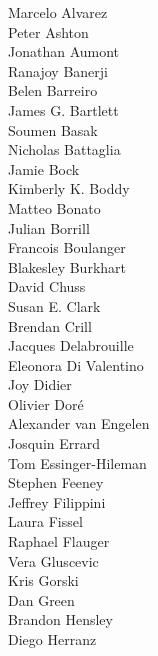 \documentclass[PICOReport.tex]{subfiles}
\begin{document}
\footnotesize {

\begin{multicols}{4}
Marcelo Alvarez                 \\
Peter Ashton                    \\
Jonathan Aumont                 \\
Ranajoy Banerji                 \\
Belen Barreiro                  \\
James G. Bartlett               \\
Soumen Basak                    \\
Nicholas Battaglia              \\
Jamie Bock                      \\
Kimberly K. Boddy               \\
Matteo Bonato                   \\
Julian Borrill                  \\
Francois Boulanger              \\
Blakesley Burkhart              \\
David Chuss                     \\
Susan E. Clark                  \\
Brendan Crill                   \\
Jacques Delabrouille            \\
Eleonora Di Valentino           \\
Joy Didier                      \\
Olivier Dor\'e                  \\
Alexander van Engelen           \\
Josquin Errard                  \\
Tom Essinger-Hileman            \\
Stephen Feeney                  \\
Jeffrey Filippini               \\
Laura Fissel                    \\
Raphael Flauger                 \\
Vera Gluscevic                  \\
Kris Gorski                     \\
Dan Green                       \\
Brandon Hensley                 \\
Diego Herranz                   \\

\end{multicols}}
\end{document}
